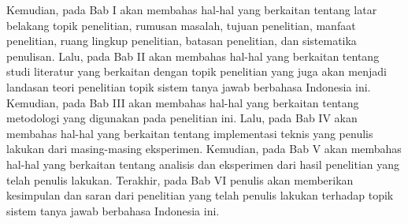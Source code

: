 Kemudian, pada Bab I akan membahas hal-hal yang berkaitan tentang latar belakang topik penelitian, rumusan masalah, tujuan penelitian, manfaat penelitian, ruang lingkup penelitian, batasan penelitian, dan sistematika penulisan. Lalu, pada Bab II akan membahas hal-hal yang berkaitan tentang studi literatur yang berkaitan dengan topik penelitian yang juga akan menjadi landasan teori penelitian topik sistem tanya jawab berbahasa Indonesia ini. Kemudian, pada Bab III akan membahas hal-hal yang berkaitan tentang metodologi yang digunakan pada penelitian ini. Lalu, pada Bab IV akan membahas hal-hal yang berkaitan tentang implementasi teknis yang penulis lakukan dari masing-masing eksperimen. Kemudian, pada Bab V akan membahas hal-hal yang berkaitan tentang analisis dan eksperimen dari hasil penelitian yang telah penulis lakukan. Terakhir, pada Bab VI penulis akan memberikan kesimpulan dan saran dari penelitian yang telah penulis lakukan terhadap topik sistem tanya jawab berbahasa Indonesia ini.
